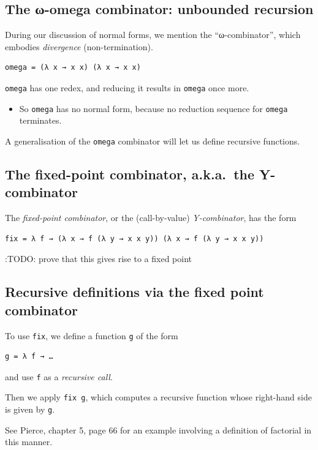 \documentclass[11pt]{article}
\theoremstyle{definition}
\begin{document}
\subsection{The ω-omega combinator: unbounded recursion}
\label{sec:orgc668b1f}

During our discussion of normal forms, we mention the “ω-combinator”,
which embodies \emph{divergence} (non-termination).
\begin{verbatim}
omega = (λ x → x x) (λ x → x x)
\end{verbatim}

\texttt{omega} has one redex, and reducing it results in \texttt{omega} once more.
\begin{itemize}
\item So \texttt{omega} has no normal form, because no reduction sequence
for \texttt{omega} terminates.
\end{itemize}

A generalisation of the \texttt{omega} combinator will let us
define recursive functions.

\subsection{The fixed-point combinator, a.k.a. the Y-combinator}
\label{sec:org954c6ee}

The \emph{fixed-point combinator}, or the (call-by-value) \emph{Y-combinator},
has the form
\begin{verbatim}
fix = λ f → (λ x → f (λ y → x x y)) (λ x → f (λ y → x x y))
\end{verbatim}

:TODO: prove that this gives rise to a fixed point

\subsection{Recursive definitions via the fixed point combinator}
\label{sec:org52f0748}

To use \texttt{fix}, we define a function \texttt{g} of the form
\begin{verbatim}
g = λ f → …
\end{verbatim}
and use \texttt{f} as a \emph{recursive call}.

Then we apply \texttt{fix g}, which computes a recursive function
whose right-hand side is given by \texttt{g}.

See Pierce, chapter 5, page 66 for an example involving
a definition of factorial in this manner.
\end{document}
